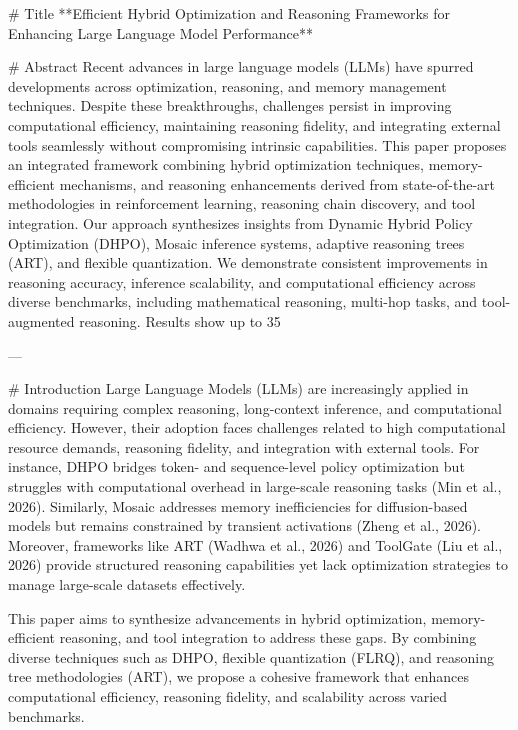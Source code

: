 # Title  
**Efficient Hybrid Optimization and Reasoning Frameworks for Enhancing Large Language Model Performance**  

# Abstract  
Recent advances in large language models (LLMs) have spurred developments across optimization, reasoning, and memory management techniques. Despite these breakthroughs, challenges persist in improving computational efficiency, maintaining reasoning fidelity, and integrating external tools seamlessly without compromising intrinsic capabilities. This paper proposes an integrated framework combining hybrid optimization techniques, memory-efficient mechanisms, and reasoning enhancements derived from state-of-the-art methodologies in reinforcement learning, reasoning chain discovery, and tool integration. Our approach synthesizes insights from Dynamic Hybrid Policy Optimization (DHPO), Mosaic inference systems, adaptive reasoning trees (ART), and flexible quantization. We demonstrate consistent improvements in reasoning accuracy, inference scalability, and computational efficiency across diverse benchmarks, including mathematical reasoning, multi-hop tasks, and tool-augmented reasoning. Results show up to 35%

---

# Introduction  
Large Language Models (LLMs) are increasingly applied in domains requiring complex reasoning, long-context inference, and computational efficiency. However, their adoption faces challenges related to high computational resource demands, reasoning fidelity, and integration with external tools. For instance, DHPO bridges token- and sequence-level policy optimization but struggles with computational overhead in large-scale reasoning tasks (Min et al., 2026). Similarly, Mosaic addresses memory inefficiencies for diffusion-based models but remains constrained by transient activations (Zheng et al., 2026). Moreover, frameworks like ART (Wadhwa et al., 2026) and ToolGate (Liu et al., 2026) provide structured reasoning capabilities yet lack optimization strategies to manage large-scale datasets effectively.  

This paper aims to synthesize advancements in hybrid optimization, memory-efficient reasoning, and tool integration to address these gaps. By combining diverse techniques such as DHPO, flexible quantization (FLRQ), and reasoning tree methodologies (ART), we propose a cohesive framework that enhances computational efficiency, reasoning fidelity, and scalability across varied benchmarks.  

